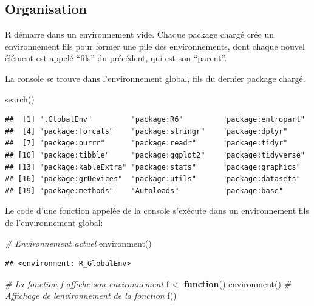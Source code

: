 \documentclass[
  11pt,
  french,
  a4paper,
  extrafontsizes,onecolumn,openright
  ]{memoir}
\newenvironment{Shaded}{\begin{snugshade}}{\end{snugshade}}
\newcommand{\CommentTok}[1]{\textcolor[rgb]{0.56,0.35,0.01}{\textit{#1}}}
\newcommand{\ControlFlowTok}[1]{\textcolor[rgb]{0.13,0.29,0.53}{\textbf{#1}}}
\newcommand{\FunctionTok}[1]{\textcolor[rgb]{0.00,0.00,0.00}{#1}}
\newcommand{\NormalTok}[1]{#1}
\newcommand{\OtherTok}[1]{\textcolor[rgb]{0.56,0.35,0.01}{#1}}
\begin{document}
\hypertarget{organisation}{%
\subsection{Organisation}\label{organisation}}

R démarre dans un environnement vide.
Chaque package chargé crée un environnement fils pour former une pile des environnements, dont chaque nouvel élément est appelé ``fils'' du précédent, qui est son ``parent''.

La console se trouve dans l'environnement global, fils du dernier package chargé.

\scriptsize

\begin{Shaded}
\begin{Highlighting}[]
\FunctionTok{search}\NormalTok{()}
\end{Highlighting}
\end{Shaded}

\begin{verbatim}
##  [1] ".GlobalEnv"         "package:R6"         "package:entropart" 
##  [4] "package:forcats"    "package:stringr"    "package:dplyr"     
##  [7] "package:purrr"      "package:readr"      "package:tidyr"     
## [10] "package:tibble"     "package:ggplot2"    "package:tidyverse" 
## [13] "package:kableExtra" "package:stats"      "package:graphics"  
## [16] "package:grDevices"  "package:utils"      "package:datasets"  
## [19] "package:methods"    "Autoloads"          "package:base"
\end{verbatim}

\normalsize

Le code d'une fonction appelée de la console s'exécute dans un environnement fils de l'environnement global:

\scriptsize

\begin{Shaded}
\begin{Highlighting}[]
\CommentTok{\# Environnement actuel}
\FunctionTok{environment}\NormalTok{()}
\end{Highlighting}
\end{Shaded}

\begin{verbatim}
## <environment: R_GlobalEnv>
\end{verbatim}

\begin{Shaded}
\begin{Highlighting}[]
\CommentTok{\# La fonction f affiche son environnement}
\NormalTok{f }\OtherTok{\textless{}{-}} \ControlFlowTok{function}\NormalTok{() }\FunctionTok{environment}\NormalTok{()}
\CommentTok{\# Affichage de l\textquotesingle{}environnement de la fonction}
\FunctionTok{f}\NormalTok{()}
\end{Highlighting}
\end{Shaded}
\end{document}
